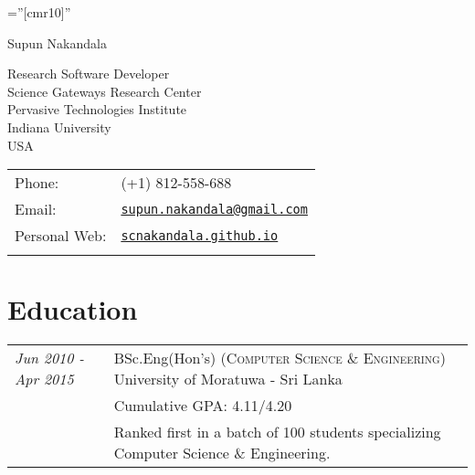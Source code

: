 \documentclass[a4paper,10pt]{article}
\begin{document}
\pagestyle{empty} %

\font\fb=''[cmr10]'' %

\par{\centering
		{\Huge Supun Nakandala}
		\bigskip
\par}


\begin{minipage}{0.58\linewidth}
  Research Software Developer\\
  Science Gateways Research Center\\
  Pervasive Technologies Institute\\
  Indiana University\\
  USA
\end{minipage}
\begin{minipage}{0.45\linewidth}
  \begin{tabular}{ll}
    Phone: & (+1) 812-558-688 \\
    Email: & \href{mailto:supun.nakandala@gmail.com}{\tt supun.nakandala@gmail.com} \\
    Personal Web: & \href{https://scnakandala.github.io}{\tt scnakandala.github.io}\\
    \\
  \end{tabular}
\end{minipage}

\section{Education}
\begin{tabular}{p{3cm}|p{13.5cm}}

\emph{Jun 2010 - Apr 2015} & BSc.Eng(Hon's) (\textsc{Computer Science \& Engineering}) University of Moratuwa - Sri Lanka\\
&\normalsize Cumulative GPA: 4.11/4.20\\
&\normalsize Ranked first in a batch of 100 students specializing Computer Science \& Engineering.

\end{tabular}
\end{document}
